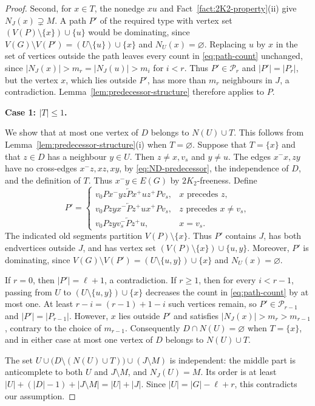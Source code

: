 \documentclass[11pt]{article}
\numberwithin{equation}{section}
\theoremstyle{plain}
\theoremstyle{definition}
\theoremstyle{plain}
\begin{document}
\begin{proof}
Second, for $x\in T$, the nonedge $xu$ and
Fact~\ref{fact:2K2-property}\textup{(ii)} give
$N_J(x)\supsetneq M$. A path $P'$ of the required type with
vertex set $(V(P)\setminus\{x\})\cup\{u\}$ would be dominating,
since $V(G)\setminus V(P')=(U\setminus\{u\})\cup\{x\}$
and $N_U(x)=\varnothing$.
Replacing $u$ by $x$ in the set of vertices outside the path leaves every count in
\eqref{eq:path-count} unchanged, since
$|N_J(x)|>m_r=|N_J(u)|>m_i$ for $i<r$.
Thus $P'\in\mathcal P_r$ and $|P'|=|P_r|$, but the vertex $x$,
which lies outside $P'$, has more than $m_r$ neighbours in $J$,   a
contradiction. Lemma~\ref{lem:predecessor-structure} therefore
applies to $P$.

\medskip
\noindent
\textbf{Case 1: $|T|\leq1$.}

We show that at most one vertex of $D$ belongs to $N(U)\cup T$.
This follows from Lemma~\ref{lem:predecessor-structure}(i) when
$T=\varnothing$. Suppose that $T=\{x\}$ and that $z\in D$
has a neighbour $y\in U$. Then $z\neq x,v_s$ and $y\neq u$.
The edges $x^-x,zy$ have no cross-edges $x^-z,xz,xy$, by
\eqref{eq:ND-predecessor}, the independence of $D$, and the
definition of $T$. Thus $x^-y\in E(G)$ by $2K_2$-freeness.
Define
\[
P'=
\begin{cases}
 v_0P x^-yz\overleftarrow P x^+uz^+P v_s,
   &x\text{ precedes }z,\\
 v_0P zyx^-\overleftarrow P z^+ux^+P v_s,
   &z\text{ precedes }x\neq v_s,\\
 v_0P zyv_s^-\overleftarrow P z^+u,
   &x=v_s.
\end{cases}
\]
The indicated old segments partition $V(P)\setminus\{x\}$.
Thus $P'$ contains $J$, has both endvertices outside $J$, and
has vertex set $(V(P)\setminus\{x\})\cup\{u,y\}$.
Moreover, $P'$ is dominating, since
$V(G)\setminus V(P')=(U\setminus\{u,y\})\cup\{x\}$
and $N_U(x)=\varnothing$.

If $r=0$, then $|P'|=\ell+1$, a contradiction. If $r\geq1$,
then for every $i<r-1$, passing from $U$ to
$(U\setminus\{u,y\})\cup\{x\}$ decreases the count in \eqref{eq:path-count} by
at most one. At least $r-i=(r-1)+1-i$ such vertices remain,
so $P'\in\mathcal P_{r-1}$ and $|P'|=|P_{r-1}|$.
However, $x$ lies outside $P'$ and satisfies
$|N_J(x)|>m_r>m_{r-1}$, contrary to the choice of $m_{r-1}$.
Consequently $D\cap N(U)=\varnothing$ when $T=\{x\}$,
and in either case at most one vertex of $D$ belongs to
$N(U)\cup T$.

The set
$U\cup\bigl(D\setminus(N(U)\cup T)\bigr)\cup(J\setminus M)$
is independent: the middle part is anticomplete to both $U$
and $J\setminus M$, and $N_J(U)=M$.
Its order is at least
$|U|+(|D|-1)+|J\setminus M|=|U|+|J|$.
Since $|U|=|G|-\ell+r$, this contradicts our assumption.


\end{proof}
\end{document}
